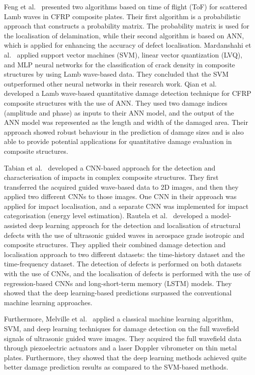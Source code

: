Feng et al.~\cite{feng2019locating} presented two algorithms based on time of flight (ToF) for scattered Lamb waves in CFRP composite plates.
Their first algorithm is a probabilistic approach that constructs a probability matrix. 
The probability matrix is used for the localisation of delamination, while their second algorithm is based on ANN, which is applied for enhancing the accuracy of defect localisation.
Mardanshahi et al.~\cite{mardanshahi2020detection} applied support vector machines (SVM), linear vector quantization (LVQ), and MLP neural networks for the classification of crack density in composite structures by using Lamb wave-based data.
They concluded that the SVM outperformed other neural networks in their research work.
Qian et al.~\cite{qian2020application} developed a Lamb wave-based quantitative damage detection technique for CFRP composite structures with the use of ANN.
They used two damage indices (amplitude and phase) as inputs to their ANN model, and the output of the ANN model was represented as the length and width of the damaged area.
Their approach showed robust behaviour in the prediction of damage sizes and is also able to provide potential applications for quantitative damage evaluation in composite structures.

Tabian et al.~\cite{Tabian2019} developed a CNN-based approach for the detection and characterisation of impacts in complex composite structures.
They first transferred the acquired guided wave-based data to 2D images, and then they applied two different CNNs to those images.
One CNN in their approach was applied for impact localisation, and a separate CNN was implemented for impact categorisation (energy level estimation).
Rautela et al.~\cite{rautela2021ultrasonic} developed a model-assisted deep learning approach for the detection and localisation of structural defects with the use of ultrasonic guided waves in aerospace grade isotropic and composite structures. 
They applied their combined damage detection and localisation approach to two different datasets: the time-history dataset and the time-frequency dataset. 
The detection of defects is performed on both datasets with the use of CNNs, and the localisation of defects is performed with the use of regression-based CNNs and long-short-term memory (LSTM) models. 
They showed that the deep learning-based predictions surpassed the conventional machine learning approaches.

Furthermore, Melville et al.~\cite{Melville2018} applied a classical machine learning algorithm, SVM, and deep learning techniques for damage detection on the full wavefield signals of ultrasonic guided wave images.
They acquired the full wavefield data through piezoelectric actuators and a laser Doppler vibrometer on thin metal plates.
Furthermore, they showed that the deep learning methods achieved quite better damage prediction results as compared to the SVM-based methods.

